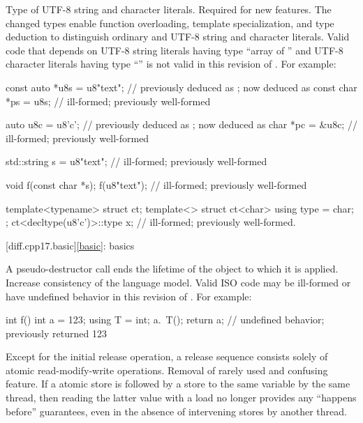 %
\change
Type of UTF-8 string and character literals.
\rationale
Required for new features.
The changed types enable function overloading, template specialization, and
type deduction to distinguish ordinary and UTF-8 string and character literals.
\effect
Valid \CppXVII{} code that depends on
UTF-8 string literals having type ``array of '' and
UTF-8 character literals having type ``''
is not valid in this revision of \Cpp{}.
For example:
\begin{codeblock}
const auto *u8s = u8"text";     //  previously deduced as ; now deduced as 
const char *ps = u8s;           // ill-formed; previously well-formed

auto u8c = u8'c';               //  previously deduced as ; now deduced as 
char *pc = &u8c;                // ill-formed; previously well-formed

std::string s = u8"text";       // ill-formed; previously well-formed

void f(const char *s);
f(u8"text");                    // ill-formed; previously well-formed

template<typename> struct ct;
template<> struct ct<char> {
  using type = char;
};
ct<decltype(u8'c')>::type x;    // ill-formed; previously well-formed.
\end{codeblock}

[diff.cpp17.basic]{\ref{basic}: basics}

\change
A pseudo-destructor call ends the lifetime of
the object to which it is applied.
\rationale
Increase consistency of the language model.
\effect
Valid ISO \CppXVII{} code may be ill-formed or
have undefined behavior in this revision of \Cpp{}.
For example:
\begin{codeblock}
int f() {
  int a = 123;
  using T = int;
  a.~T();
  return a;         // undefined behavior; previously returned 123
}
\end{codeblock}

\change
Except for the initial release operation,
a release sequence consists solely of atomic read-modify-write operations.
\rationale
Removal of rarely used and confusing feature.
\effect
If a  atomic store is followed
by a  store to the same variable by the same thread,
then reading the latter value with a  load
no longer provides any ``happens before'' guarantees,
even in the absence of intervening stores by another thread.

